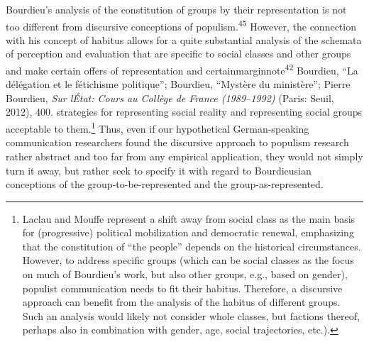 \documentclass{tufte-handout}
\begin{document}
Bourdieu's analysis of the constitution of groups by their
representation is not too different from discursive conceptions of
populism.\textsuperscript{45} However, the connection with his concept of habitus
allows for a quite substantial analysis of the schemata of perception
and evaluation that are specific to social classes and other groups and
make certain offers of representation and certainmarginnote{\textsuperscript{42} Bourdieu, ``La délégation et le fétichisme
  politique''; Bourdieu, ``Mystère du ministère''; Pierre Bourdieu,
  \emph{Sur l\textquotesingle État: Cours au Collège de France
  (1989--1992)} (Paris: Seuil, 2012), 400.} strategies for
representing social reality and representing social groups acceptable to
them.\footnote{Laclau and Mouffe represent a shift away from social
  class as the main basis for (progressive) political mobilization and
  democratic renewal, emphasizing that the constitution of ``the
  people'' depends on the historical circumstances. However, to address
  specific groups (which can be social classes as the focus on much of
  Bourdieu's work, but also other groups, e.g., based on gender),
  populist communication needs to fit their habitus. Therefore, a
  discursive approach can benefit from the analysis of the habitus of
  different groups. Such an analysis would likely not consider whole
  classes, but factions thereof, perhaps also in combination with
  gender, age, social trajectories, etc.).} Thus, even if our
hypothetical German-speaking communication researchers found the
discursive approach to populism research rather abstract and too far
from any empirical application, they would not simply turn it away, but
rather seek to specify it with regard to Bourdieusian conceptions of the
group-to-be-represented and the group-as-represented.
\end{document}
